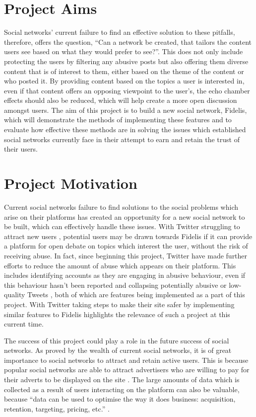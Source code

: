 \section{Project Aims}
Social networks' current failure to find an effective solution to these pitfalls, therefore, offers the question, ``Can a network be created, that tailors the content users see based on what they would prefer to see?''. This does not only include protecting the users by filtering any abusive posts but also offering them diverse content that is of interest to them, either based on the theme of the content or who posted it. By providing content based on the topics a user is interested in, even if that content offers an opposing viewpoint to the user's, the echo chamber effects should also be reduced, which will help create a more open discussion amongst users. The aim of this project is to build a new social network, Fidelis, which will demonstrate the methods of implementing these features and to evaluate how effective these methods are in solving the issues which established social networks currently face in their attempt to earn and retain the trust of their users.

\section{Project Motivation}
Current social networks failure to find solutions to the social problems which arise on their platforms has created an opportunity for a new social network to be built, which can effectively handle these issues. With Twitter struggling to attract new users \cite{Barrons:Twitter}, potential users may be drawn towards Fidelis if it can provide a platform for open debate on topics which interest the user, without the risk of receiving abuse. In fact, since beginning this project, Twitter have made further efforts to reduce the amount of abuse which appears on their platform. This includes identifying accounts as they are engaging in abusive behaviour, even if this behaviour hasn't been reported and collapsing potentially abusive or low-quality Tweets \cite{Twitter:Safety}, both of which are features being implemented as a part of this project. With Twitter taking steps to make their site safer by implementing similar features to Fidelis highlights the relevance of such a project at this current time.

The success of this project could play a role in the future success of social networks. As proved by the wealth of current social networks, it is of great importance to social networks to attract and retain active users. This is because popular social networks are able to attract advertisers who are willing to pay for their adverts to be displayed on the site \cite{Investopedia:Adverts}. The large amounts of data which is collected as a result of users interacting on the platform can also be valuable, because ``data can be used to optimise the way it does business: acquisition, retention, targeting, pricing, etc.'' \cite{TechCrunch:Data}.

